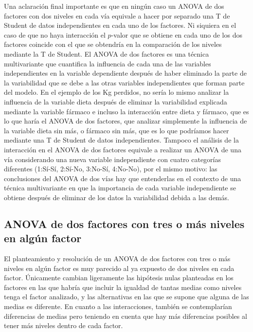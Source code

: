 \documentclass[
  spanish,
  a4paper,
]{scrreport}
\theoremstyle{plain}
\theoremstyle{definition}
\theoremstyle{definition}
\theoremstyle{remark}
\begin{document}
Una aclaración final importante es que en ningún caso un ANOVA de dos
factores con dos niveles en cada vía equivale a hacer por separado una T
de Student de datos independientes en cada uno de los factores. Ni
siquiera en el caso de que no haya interacción el \(p\)-valor que se
obtiene en cada uno de los dos factores coincide con el que se obtendría
en la comparación de los niveles mediante la T de Student. El ANOVA de
dos factores es una técnica multivariante que cuantifica la influencia
de cada una de las variables independientes en la variable dependiente
después de haber eliminado la parte de la variabilidad que se debe a las
otras variables independientes que forman parte del modelo. En el
ejemplo de los Kg perdidos, no sería lo mismo analizar la influencia de
la variable dieta después de eliminar la variabilidad explicada mediante
la variable fármaco e incluso la interacción entre dieta y fármaco, que
es lo que haría el ANOVA de dos factores, que analizar simplemente la
influencia de la variable dieta sin más, o fármaco sin más, que es lo
que podríamos hacer mediante una T de Student de datos independientes.
Tampoco el análisis de la interacción en el ANOVA de dos factores
equivale a realizar un ANOVA de una vía considerando una nueva variable
independiente con cuatro categorías diferentes (1:Sí-Sí, 2:Sí-No,
3:No-Sí, 4:No-No), por el mismo motivo: las conclusiones del ANOVA de
dos vías hay que entenderlas en el contexto de una técnica multivariante
en que la importancia de cada variable independiente se obtiene después
de eliminar de los datos la variabilidad debida a las demás.

\subsection{ANOVA de dos factores con tres o más niveles en algún
factor}\label{anova-de-dos-factores-con-tres-o-muxe1s-niveles-en-alguxfan-factor}

El planteamiento y resolución de un ANOVA de dos factores con tres o más
niveles en algún factor es muy parecido al ya expuesto de dos niveles en
cada factor. Únicamente cambian ligeramente las hipótesis nulas
planteadas en los factores en las que habría que incluir la igualdad de
tantas medias como niveles tenga el factor analizado, y las alternativas
en las que se supone que alguna de las medias es diferente. En cuanto a
las interacciones, también se contemplarían diferencias de medias pero
teniendo en cuenta que hay más diferencias posibles al tener más niveles
dentro de cada factor.
\end{document}
